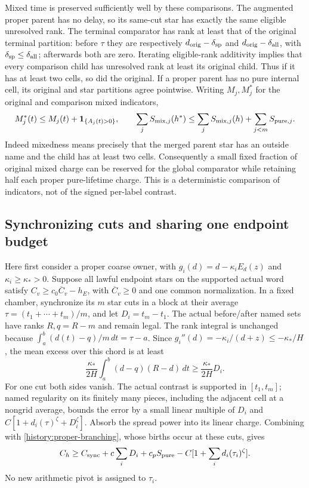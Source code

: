 Mixed time is preserved sufficiently well by these comparisons.
The augmented proper parent has no delay, so its same-cut star has
exactly the same eligible unresolved rank. The terminal comparator
has rank at least that of the original terminal partition: before
$\tau$ they are respectively $d_{\rm orig}-\delta_{\rm sp}$ and
$d_{\rm orig}-\delta_{\rm all}$, with
$\delta_{\rm sp}\le\delta_{\rm all}$; afterwards both are zero.
Iterating eligible-rank additivity implies that every comparison child
has unresolved rank at least its original child. Thus if it has at
least two cells, so did the original. If a proper parent has no pure
internal cell, its original and star partitions agree pointwise.
Writing $M_j,M_j^*$ for the original and comparison mixed indicators,
\begin{equation}
 M_j^*(t)\le M_j(t)+\mathbf1_{\{A_j(t)>0\}},\qquad
 \sum_jS_{{\rm mix},j}(h^*)\le
     \sum_jS_{{\rm mix},j}(h)+\sum_{j<m}S_{{\rm pure},j}.
 \label{history:mixed-domination}
\end{equation}
Indeed mixedness means precisely that the merged parent star has an
outside name and the child has at least two cells. Consequently a
small fixed fraction of original mixed charge can be reserved for the
global comparator while retaining half each proper pure-lifetime
charge. This is a deterministic comparison of indicators, not of the
signed per-label contrast.

\subsection{Synchronizing cuts and sharing one endpoint budget}

Here first consider a proper coarse owner, with
$g_i(d)=d-\kappa_iE_d(z)$ and $\kappa_i\ge\kappa_*>0$.
Suppose all lawful endpoint stars on the supported actual word satisfy
$C_v\ge c_0\overline C_v-h_E$, with $\overline C_v\ge0$ and
one common normalization. In a fixed chamber, synchronize its $m$
star cuts in a block at their average
$\tau=(t_1+\cdots+t_m)/m$, and let $D_i=t_m-t_1$.
The actual before/after named sets have ranks $R,q=R-m$ and remain
legal. The rank integral is unchanged because
$\int_a^b(d(t)-q)/m\,dt=\tau-a$.
Since $g_i''(d)=-\kappa_i/(d+z)\le-\kappa_*/H$, the mean excess
over this chord is at least
\[
 \frac{\kappa_*}{2H}\int_a^b(d-q)(R-d)\,dt
              \ge\frac{\kappa_*}{2H}D_i.
\]
For one cut both sides vanish. The actual contrast is supported in
$[t_1,t_m]$; named regularity on its finitely many pieces, including
the adjacent cell at a nongrid average, bounds the error by a small
linear multiple of $D_i$ and $C[1+d_i(\tau)^\zeta+D_i^\zeta]$.
Absorb the spread power into its linear charge. Combining with
\eqref{history:proper-branching}, whose births occur at these cuts,
gives
\begin{equation}
 C_h\ge C_{\rm sync}+c\sum_iD_i+c_pS_{\rm pure}
                   -C[1+\sum_id_i(\tau_i)^\zeta].
 \label{history:synchronize}
\end{equation}
No new arithmetic pivot is assigned to $\tau_i$.

